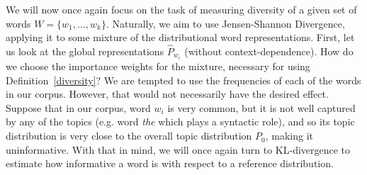 


We will now once again
focus on the task of measuring diversity of a given set of words
$W=\{w_1,...,w_k\}$. Naturally, we aim to use Jensen-Shannon
Divergence, applying it to some mixture of the distributional word
representations. First, let us look at the global representations
$\widehat{P}_{w_i}$ (without context-dependence). How do we choose the
importance weights for the mixture, necessary for using
Definition~\ref{diversity}? We 
are tempted to use the frequencies of each of the words in our
corpus. However, that would not  
necessarily have the desired effect. Suppose that in our
corpus, word $w_i$ is very common, but it is not well captured by any of
the topics (e.g. word {\em the} which plays a syntactic role), and
so its topic distribution is very close to the overall 
topic distribution $P_0$, making it uninformative. With
that in mind, we will once again turn to KL-divergence to
estimate how informative a word is with respect to a reference distribution.

